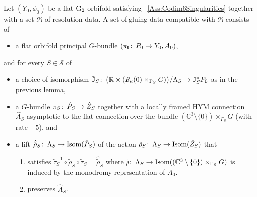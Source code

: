 \documentclass[11pt,a4paper]{scrartcl}
\newcommand{\col}{\colon \thinspace}
\newcommand{\G}{\textup{G}}
\numberwithin{equation}{section}
\theoremstyle{plain}
\theoremstyle{definition}
\theoremstyle{remark}
\begin{document}
\begin{definition}\label{def:gluing_data}
Let $(Y_0,\phi_0)$ be a flat $\G_2$-orbifold satisfying ~\autoref{Ass:Codim6Singularities} together with a set $\mathfrak{R}$ of resolution data. A set of gluing data compatible with $\mathfrak{R}$ consists of
\begin{itemize}
\item a flat orbifold principal $G$-bundle $(\pi_0\col P_0 \to Y_0,A_0)$,
\end{itemize} 
and for every $S \in \mathcal{S}$ of 
\begin{itemize}
\item a choice of isomorphism $\tilde{\mathtt{J}}_S \col \big(\mathbb{R}\times (B_\kappa(0)\times_{\Gamma_S} G)\big)/\Lambda_S \to \mathtt{J}^*_SP_0$ as in the previous lemma,
\item a $G$-bundle $\pi_S\col \hat{P}_S \to \hat{Z}_S$ together with a locally framed HYM connection $\hat{A}_S$ asymptotic to the flat connection over the bundle $(\mathbb{C}^3\setminus\{0\}) \times_{\Gamma_S} G$ (with rate $-5$), and
\item a lift $\hat{\tilde{\rho}}_S \col \Lambda_S \to \textup{Isom}(\hat{P}_S)$ of the action $\hat{\rho}_S \col \Lambda_S \to \textup{Isom}(\hat{Z}_S)$ that 
\begin{enumerate}
\item satisfies $\tilde{\tau}_S^{-1}\circ \tilde{\rho}_S \circ \tilde{\tau}_S = \hat{\tilde{\rho}}_S$ where $\tilde{\rho} \col \Lambda_S \to \textup{Isom}((\mathbb{C}^3\setminus\{0\}) \times_{\Gamma_S} G)$ is induced by the monodromy representation of $A_0$. 
\item preserves $\hat{A}_S$.
\end{enumerate}
\end{itemize}
\end{definition}
\end{document}
